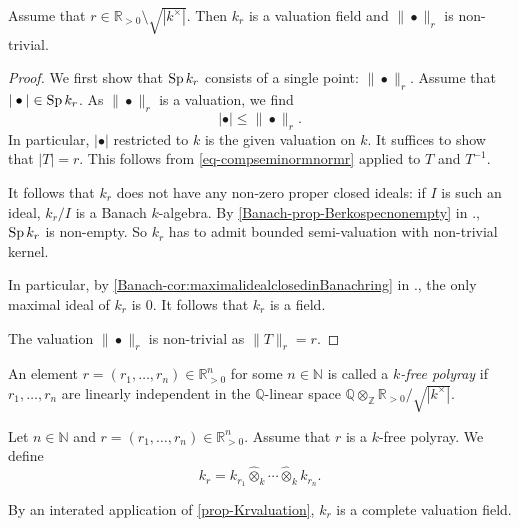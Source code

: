 \begin{proposition}\label{prop-Krvaluation}
    Assume that $r\in \mathbb{R}_{>0}\setminus \sqrt{|k^{\times}|}$. Then $k_r$ is a valuation field and $\|\bullet\|_r$ is non-trivial.
\end{proposition}
\begin{proof}
    We first show that $\operatorname{Sp} k_r$ consists of a single point: $\|\bullet\|_r$. Assume that $|\bullet|\in \operatorname{Sp} k_r$. As $\|\bullet\|_r$ is a valuation, we find 
    \begin{equation}\label{eq-compseminormnormr}
      |\bullet|\leq \|\bullet\|_r.  
    \end{equation}
    In particular, $|\bullet|$ restricted to $k$ is the given valuation on $k$. It suffices to show that $|T|=r$. This follows from \eqref{eq-compseminormnormr} applied to $T$ and $T^{-1}$.

    It follows that $k_r$ does not have any non-zero proper closed ideals: if $I$ is such an ideal, $k_r/I$ is a Banach $k$-algebra. By \cref{Banach-prop-Berkospecnonempty} in ., $\operatorname{Sp} k_r$ is non-empty. So $k_r$ has to admit bounded semi-valuation with non-trivial kernel.

    In particular, by \cref{Banach-cor:maximalidealclosedinBanachring} in ., the only maximal ideal of $k_r$ is $0$. It follows that $k_r$ is a field.

    The valuation $\|\bullet\|_r$ is non-trivial as $\|T\|_r=r$.
\end{proof}

\begin{definition}\label{def-kfreekr}
    An element $r=(r_1,\ldots,r_n)\in \mathbb{R}^n_{>0}$ for some $n\in \mathbb{N}$ is called a \emph{$k$-free polyray} if $r_1,\ldots,r_n$ are linearly independent in the $\mathbb{Q}$-linear space $\mathbb{Q}\otimes_{\mathbb{Z}}\mathbb{R}_{>0}/\sqrt{|k^{\times}|}$.

    Let $n\in \mathbb{N}$ and $r=(r_1,\ldots,r_n)\in \mathbb{R}^n_{>0}$. Assume that $r$ is a $k$-free polyray. We define 
    \[
        k_r=k_{r_1}\hat{\otimes}_k \cdots \hat{\otimes}_k k_{r_n}.  
    \]
\end{definition}
By an interated application of \cref{prop-Krvaluation}, $k_r$ is a complete valuation field.

